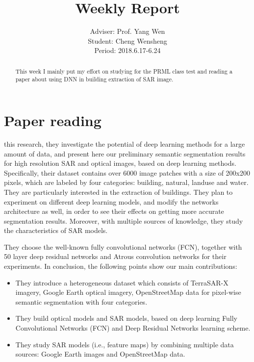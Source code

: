 \documentclass[]{IEEEtran}
\begin{document}
	\title{Weekly Report}
	\author{Adviser: Prof. Yang Wen \\Student: Cheng Wensheng\\ Period: 2018.6.17-6.24
	}
	\maketitle

\begin{abstract}
	This week I mainly put my effort on studying for the PRML class test and reading a paper about using DNN in building extraction of SAR image. 
\end{abstract}

\section{Paper reading}
	 this research, they investigate the potential of	deep learning methods for a large amount of data, and present	here our preliminary semantic segmentation results for high resolution SAR and optical images, based on deep learning methods. Specifically, their dataset contains over 6000 image patches with a size of 200x200 pixels, which are labeled by four categories: building, natural, landuse and water. They are particularly interested in the extraction of buildings. They	plan to experiment on different deep learning models, and modify the networks architecture as well, in order to see	their effects on getting more accurate segmentation results. Moreover, with multiple sources of knowledge, they study the characteristics of SAR models.

	They choose the well-known fully convolutional networks
	(FCN), together with 50 layer deep residual networks and
	Atrous convolution networks for their experiments.
	In conclusion, the following points show our main contributions:
	\begin{itemize}
		\item They introduce a heterogeneous dataset which consists
		of TerraSAR-X imagery, Google Earth optical imagery,
		OpenStreetMap data for pixel-wise semantic segmentation
		with four categories.
		\item They build optical models and SAR models, based on
		deep learning Fully Convolutional Networks (FCN)
		and Deep Residual Networks learning scheme.
		\item They study SAR models (i.e., feature maps) by combining multiple data sources: Google Earth images and
		OpenStreetMap data.
	\end{itemize}
	
\end{document}
